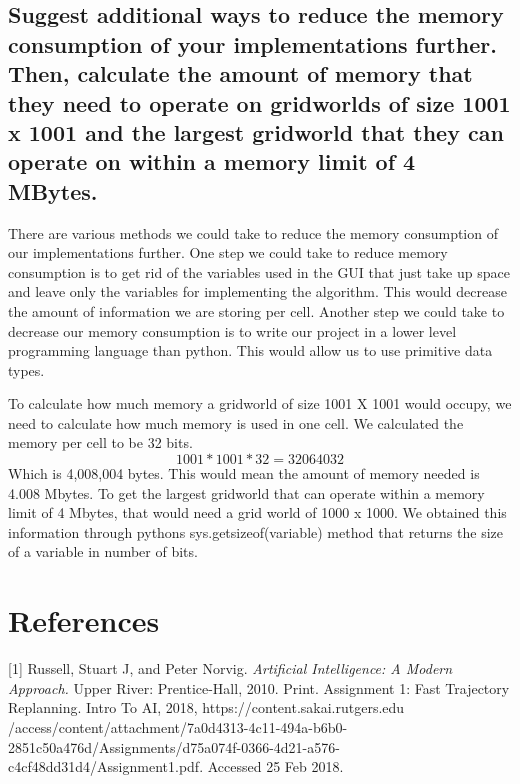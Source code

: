 \documentclass[paper=a4, fontsize=11pt]{scrartcl} %
\begin{document}
\subsection*{Suggest additional ways to reduce the memory consumption of your implementations further. Then, calculate the amount of memory that they need to operate on gridworlds of size 1001 x 1001 and the largest gridworld that they can operate on within a memory limit of 4 MBytes.}

There are various methods we could take to reduce the memory consumption of our implementations further. One step we could take to reduce memory consumption is to get rid of the variables used in the GUI that just take up space and leave only the variables for implementing the algorithm. This would decrease the amount of information we are storing per cell. Another step we could take to decrease our memory consumption is to write our project in a lower level programming language than python. This would allow us to use primitive data types. 

To calculate how much memory a gridworld of size 1001 X 1001 would occupy, we need to calculate how much memory is used in one cell. We calculated the memory per cell to be 32 bits.
\[1001*1001*32 = 32064032\] Which is 4,008,004 bytes. This would mean the amount of memory needed is 4.008 Mbytes. To get the largest gridworld that can operate within a memory limit of 4 Mbytes, that would need a grid world of 1000 x 1000. We obtained this information through pythons sys.getsizeof(variable) method that returns the size of  a variable in number of bits.




\section{References}
[1] Russell, Stuart J, and Peter Norvig. \textit{Artificial Intelligence: A Modern Approach.} Upper River: Prentice-Hall, 2010. Print. \newline
[2] Assignment 1: Fast Trajectory Replanning. Intro To AI, 2018, https://content.sakai.rutgers.edu
/access/content/attachment/7a0d4313-4c11-494a-b6b0-2851c50a476d/Assignments/d75a074f-0366-4d21-a576-c4cf48dd31d4/Assignment1.pdf. Accessed 25 Feb 2018.
\end{document}
